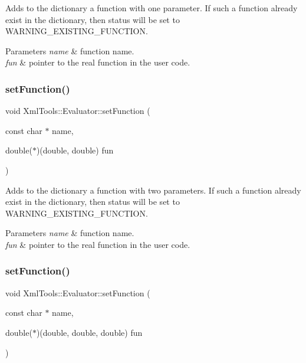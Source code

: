 Adds to the dictionary a function with one parameter. If such a function already exist in the dictionary, then status will be set to W\+A\+R\+N\+I\+N\+G\+\_\+\+E\+X\+I\+S\+T\+I\+N\+G\+\_\+\+F\+U\+N\+C\+T\+I\+ON.


\begin{DoxyParams}{Parameters}
{\em name} & function name. \\
\hline
{\em fun} & pointer to the real function in the user code. \\
\hline
\end{DoxyParams}
\hypertarget{class_xml_tools_1_1_evaluator_a831f5dc1635829ad2b09e79ada885771}{}\label{class_xml_tools_1_1_evaluator_a831f5dc1635829ad2b09e79ada885771} 
\subsubsection{\texorpdfstring{set\+Function()}{setFunction()}\hspace{0.1cm}{\footnotesize\ttfamily [3/6]}}
{\footnotesize\ttfamily void Xml\+Tools\+::\+Evaluator\+::set\+Function (\begin{DoxyParamCaption}\item[{const char $\ast$}]{name,  }\item[{double($\ast$)(double, double)}]{fun }\end{DoxyParamCaption})}

Adds to the dictionary a function with two parameters. If such a function already exist in the dictionary, then status will be set to W\+A\+R\+N\+I\+N\+G\+\_\+\+E\+X\+I\+S\+T\+I\+N\+G\+\_\+\+F\+U\+N\+C\+T\+I\+ON.


\begin{DoxyParams}{Parameters}
{\em name} & function name. \\
\hline
{\em fun} & pointer to the real function in the user code. \\
\hline
\end{DoxyParams}
\hypertarget{class_xml_tools_1_1_evaluator_a40b7b86078c23765a6ab09636fece140}{}\label{class_xml_tools_1_1_evaluator_a40b7b86078c23765a6ab09636fece140} 
\subsubsection{\texorpdfstring{set\+Function()}{setFunction()}\hspace{0.1cm}{\footnotesize\ttfamily [4/6]}}
{\footnotesize\ttfamily void Xml\+Tools\+::\+Evaluator\+::set\+Function (\begin{DoxyParamCaption}\item[{const char $\ast$}]{name,  }\item[{double($\ast$)(double, double, double)}]{fun }\end{DoxyParamCaption})}

